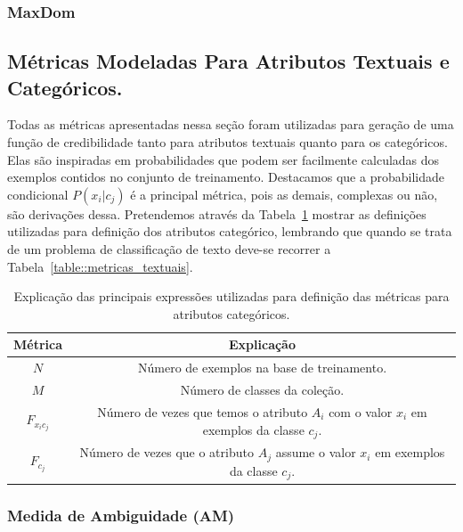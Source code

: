 \subsubsection{MaxDom}
\label{subsubsection::maxdom}



\subsection{Métricas Modeladas Para Atributos Textuais e Categóricos.}
\label{subsec::pg_metricas_conteudo}


Todas as métricas apresentadas nessa seção foram utilizadas para geração de uma função de credibilidade tanto para atributos textuais quanto para os categóricos. Elas são inspiradas em probabilidades que podem ser facilmente calculadas dos exemplos contidos no conjunto de treinamento. Destacamos que a probabilidade condicional $P(x_i|c_j)$ é a principal métrica, pois as demais, complexas ou não, são derivações dessa. Pretendemos através da Tabela~\ref{table::metricas_textuais_categoricos} mostrar as definições utilizadas para definição dos atributos categórico, lembrando que quando se trata de um problema de classificação de texto deve-se recorrer a Tabela~\ref{table::metricas_textuais}.


\begin{table}[ht*]
\centering
\begin{tabular}{|c|c|}
\toprule
    \textbf{Métrica} & \textbf{Explicação} \\
\midrule
    $N$           & Número de exemplos na base de treinamento. \tabularnewline \hline
    $M$           & Número de classes da coleção. \tabularnewline \hline
    $F_{x_ic_j}$  & Número de vezes que temos o atributo $A_i$ com o valor $x_i$ em exemplos da classe $c_j$. \tabularnewline \hline
    $F_{c_j}$     & Número de vezes que o atributo $A_j$ assume o valor $x_i$ em exemplos da classe $c_j$. \tabularnewline 
\bottomrule
\end{tabular}
\caption{Explicação das principais expressões utilizadas para definição das métricas para atributos categóricos.}
\label{table::metricas_textuais_categoricos}
\end{table}

\subsubsection{Medida de Ambiguidade (AM)}
\label{subsubsection::am}


